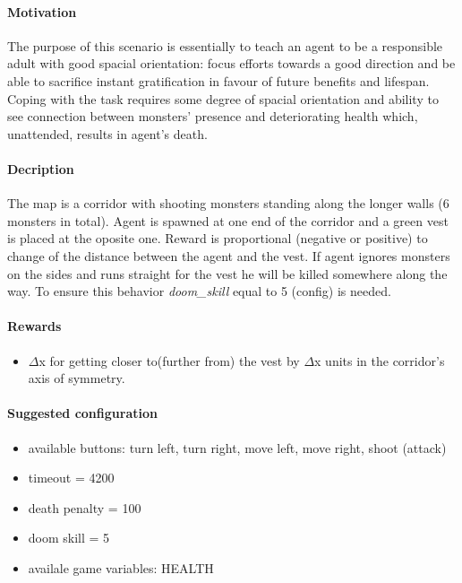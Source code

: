		\paragraph{Motivation} 
			The purpose of this scenario is essentially to teach an agent to be a responsible adult with good spacial orientation: focus efforts towards a good direction and be able to sacrifice instant gratification in favour of future benefits and lifespan. Coping with the task requires some degree of spacial orientation and ability to see connection between monsters' presence and deteriorating health which, unattended, results in agent's death.

		\paragraph{Decription}
			The map is a corridor with shooting monsters standing along the longer walls (6 monsters in total). Agent is spawned at one end of the corridor and a green vest is placed at the oposite one. Reward is proportional (negative or positive) to change of the distance between the agent and the vest. If agent ignores monsters on the sides and runs straight for the vest he will be killed somewhere along the way. To ensure this behavior \textit{doom\_skill} equal to 5 (config) is needed.

		\paragraph{Rewards}
			\begin{itemize}
				\item $\Delta$x for getting closer to(further from) the vest by $\Delta$x units in the corridor's axis of symmetry.
			\end{itemize}
			
		\paragraph{Suggested configuration}
			\begin{itemize}
				\item available buttons: turn left, turn right, move left, move right, shoot (attack)
				\item timeout = 4200
				\item death penalty = 100
				\item doom skill = 5
				\item availale game variables: HEALTH
			\end{itemize}
	\newpage

